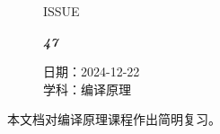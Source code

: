 \documentclass[UTF8]{ctexart}
\newcommand\Black[1]{\textcolor[gray]{0.3}{#1}}
\newcommand\Brown[1]{\textcolor[HTML]{998A4E}{#1}}
\newcommand\IssueNumber{47}
\newcommand\Date{2024-12-22}
\newcommand\Subject{编译原理}
\begin{document}
\begin{figure}[H]
\hspace{1cm}
\begin{minipage}[t]{0.3\textwidth}
\centering
    \Brown{\Genshin ISSUE}

    \vspace{-0.6cm}
    \Huge \Issue\slshape\bfseries\Black{\IssueNumber}
\end{minipage}
\hfill
\begin{minipage}[t]{0.28\textwidth}
\centering
    \Brown{日期：\Date} \\
\vspace{-0.1cm}
    \Brown{学科：\Subject} \\
\end{minipage}
\hspace{0.8cm}
\end{figure}

{\color{cyan!50!black}
\begin{center}
  本文档对编译原理课程作出简明复习。
\end{center}}

\tableofcontents

\BgThispage
\newpage
\end{document}
